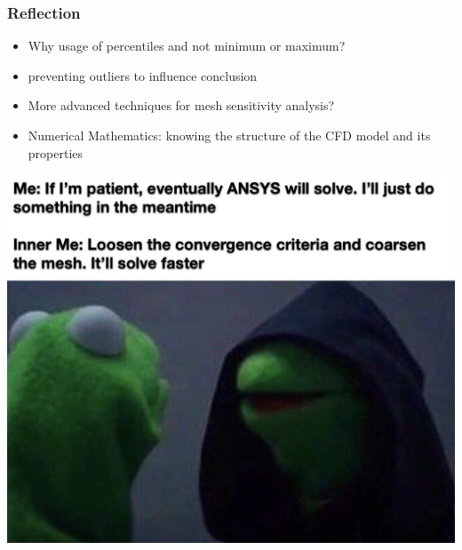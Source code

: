 \documentclass[11pt,t]{beamer}
\begin{document}
    \begin{frame}
        \frametitle{Reflection}
        \begin{itemize}
            \item<2-> Why usage of percentiles and not minimum or maximum?
            \item<3->[$\rightarrow$] preventing outliers to influence conclusion
            \item<4-> More advanced techniques for mesh sensitivity analysis?
            \item<5->[$\rightarrow$] Numerical Mathematics: knowing the structure of the CFD model and its properties
        \end{itemize}
    \end{frame}

    \begin{frame}
        \begin{center}
            \includegraphics[width=\textwidth]{IMG_3565.jpg}    
        \end{center}
    \end{frame}
\end{document}
